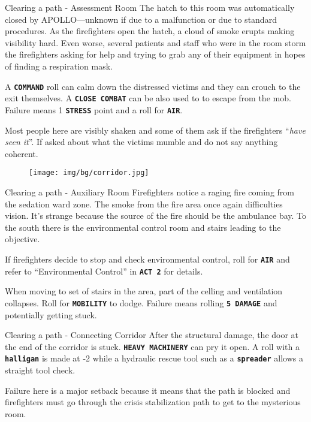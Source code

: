 \begin{rpg-commentbox}{Clearing a path - Assessment Room}
    The hatch to this room was automatically closed by APOLLO---unknown if due to a malfunction or due to standard procedures. As the firefighters open the hatch, a cloud of smoke erupts making visibility hard. Even worse, several patients and staff who were in the room storm the firefighters asking for help and trying to grab any of their equipment in hopes of finding a respiration mask. 

    A \texttt{\textbf{COMMAND}} roll can calm down the distressed victims and they can crouch to the exit themselves. A \texttt{\textbf{CLOSE COMBAT}} can be also used to to escape from the mob. 
    Failure means 1 \texttt{\textbf{STRESS}} point and a roll for \texttt{\textbf{AIR}}.

    Most people here are visibly shaken and some of them ask if the firefighters ``\textit{have seen it}''. If asked about what the victims mumble and do not say anything coherent. 
\end{rpg-commentbox}  


\begin{figure}[!b]
    \centering
    \texttt{[image: img/bg/corridor.jpg]}
\end{figure}

\begin{rpg-commentbox}{Clearing a path - Auxiliary Room}
    Firefighters notice a raging fire coming from the sedation ward zone. The smoke from the fire area once again difficulties vision. 
    It's strange because the source of the fire should be the ambulance bay. To the south there is the environmental control room and stairs leading to the objective. 
    
    If firefighters decide to stop and check environmental control, roll for \texttt{\textbf{AIR}} and refer to ``Environmental Control'' in \texttt{\textbf{ACT 2}} for details.


    When moving  to  set of stairs in the area, part of the celling and ventilation collapses. 
    Roll for \texttt{\textbf{MOBILITY}} to dodge. Failure means rolling 
    \texttt{\textbf{5 DAMAGE}} and potentially getting stuck.    
    
\end{rpg-commentbox}  


\clearpage


\begin{rpg-commentbox}{Clearing a path - Connecting Corridor}    
    After the structural damage, the door at the end of the corridor is stuck.
    \texttt{\textbf{HEAVY MACHINERY}} can pry it open. 
    A roll with a \texttt{\textbf{halligan}} is made at -2 while a hydraulic rescue tool such as a \texttt{\textbf{spreader}} allows a straight tool check.

    Failure here is a major setback because it means that the path is blocked and firefighters must go through the crisis stabilization path to get to the mysterious room. 
\end{rpg-commentbox}  


